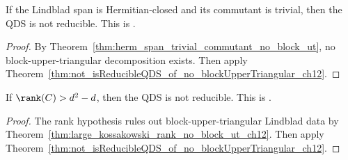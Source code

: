 \begin{theorem}
    \label{thm:not_isReducible_of_hermitian_span_trivial_commutant}
    \leanok
    If the Lindblad span is Hermitian-closed and its commutant is trivial,
    then the QDS is not reducible.
    This is \cite[Corollary~7.2(2)]{Wolf2012Quantum}.
\end{theorem}

\begin{proof}\leanok
    By Theorem~\ref{thm:herm_span_trivial_commutant_no_block_ut}, no
    block-upper-triangular decomposition exists. Then apply
    Theorem~\ref{thm:not_isReducibleQDS_of_no_blockUpperTriangular_ch12}.
\end{proof}

\begin{theorem}
    \label{thm:not_isReducible_of_kossakowski_rank_ge}
    \leanok
    If $\rank(C)>d^2-d$, then the QDS is not reducible.
    This is \cite[Corollary~7.2(3)]{Wolf2012Quantum}.
\end{theorem}

\begin{proof}\leanok
    The rank hypothesis rules out block-upper-triangular Lindblad data by
    Theorem~\ref{thm:large_kossakowski_rank_no_block_ut_ch12}. Then apply
    Theorem~\ref{thm:not_isReducibleQDS_of_no_blockUpperTriangular_ch12}.
\end{proof}
